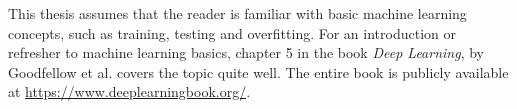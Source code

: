 This thesis assumes that the reader is familiar with basic machine learning concepts, such as training, testing and overfitting. For an introduction or refresher to machine learning basics, chapter 5 in the book \textit{Deep Learning}, by Goodfellow et al. \cite{goodfellow} covers the topic quite well. The entire book is publicly available at \href{https://www.deeplearningbook.org/}{https://www.deeplearningbook.org/}.
